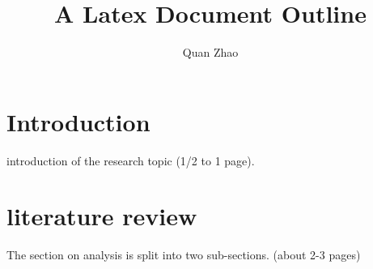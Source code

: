 \documentclass{article}
\begin{document}
\title{A Latex Document Outline}

\author{Quan Zhao}

\maketitle


\section{Introduction}
introduction of the research topic
(1/2 to 1 page).

\section{literature review}
The section on analysis is split into two sub-sections. 
(about 2-3 pages)
\cite{mrc_paper}


\end{document}
